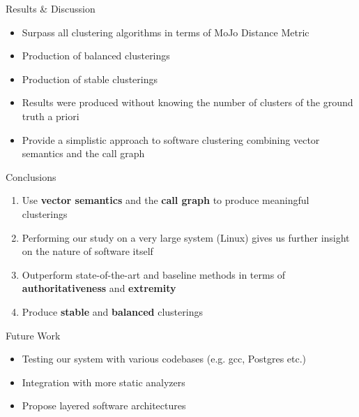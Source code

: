 \documentclass{beamer}
\begin{document}
\begin{frame}{Results \& Discussion}

\begin{itemize}
    \item<1-> Surpass all clustering algorithms in terms of MoJo Distance Metric
    \item<2-> Production of balanced clusterings 
    \item<3-> Production of stable clusterings 
    \item<4-> Results were produced without knowing the number of clusters of the ground truth a priori
    \item<5-> Provide a simplistic approach to software clustering combining vector semantics and the call graph
\end{itemize}
    
\end{frame}

\begin{frame}{Conclusions}

\begin{enumerate}
    \item<1-> Use \textbf{vector semantics} and the \textbf{call graph} to produce meaningful clusterings
    \item<2-> Performing our study on a very large system (Linux) gives us further insight on the nature of software itself
    \item<3-> Outperform state-of-the-art and baseline methods in terms of \textbf{authoritativeness} and \textbf{extremity}
    \item<4-> Produce \textbf{stable} and \textbf{balanced} clusterings 
\end{enumerate}
    
\end{frame}

\begin{frame}{Future Work}

\begin{itemize}
    \item Testing our system with various codebases (e.g. gcc, Postgres etc.)
    \item Integration with more static analyzers 
    \item Propose layered software architectures
\end{itemize}
    
\end{frame}
\end{document}
